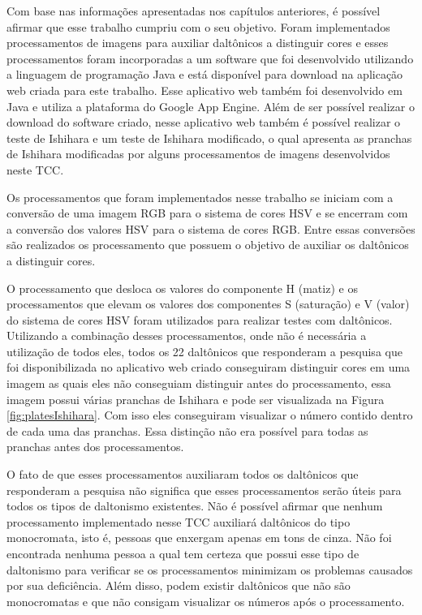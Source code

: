 \documentclass[	12pt, Times, openright, twoside, a4paper, english, brazil]{abntex2}
\begin{document}
Com base nas informações apresentadas nos capítulos anteriores, é possível afirmar que esse trabalho cumpriu com o seu objetivo. Foram implementados processamentos de imagens para auxiliar daltônicos a distinguir cores e esses processamentos foram incorporadas a um software que foi desenvolvido utilizando a linguagem de programação Java e está disponível para download na aplicação web criada para este trabalho. Esse aplicativo web também foi desenvolvido em Java e utiliza a plataforma do Google App Engine. Além de ser possível realizar o download do software criado, nesse aplicativo web também é possível realizar o teste de Ishihara e um teste de Ishihara modificado, o qual apresenta as pranchas de Ishihara modificadas por alguns processamentos de imagens desenvolvidos neste TCC.

Os processamentos que foram implementados nesse trabalho se iniciam com a conversão de uma imagem RGB para o sistema de cores HSV e se encerram com a conversão dos valores HSV para o sistema de cores RGB. Entre essas conversões são realizados os processamento que possuem o objetivo de auxiliar os daltônicos a distinguir cores.

O processamento que desloca os valores do componente H (matiz) e os processamentos que elevam os valores dos componentes S (saturação) e V (valor) do sistema de cores HSV foram utilizados para realizar testes com daltônicos. Utilizando a combinação desses processamentos, onde não é necessária a utilização de todos eles, todos os 22 daltônicos que responderam a pesquisa que foi disponibilizada no aplicativo web criado conseguiram distinguir cores em uma imagem as quais eles não conseguiam distinguir antes do processamento, essa imagem possui várias pranchas de Ishihara e pode ser visualizada na Figura \ref{fig:platesIshihara}. Com isso eles conseguiram visualizar o número contido dentro de cada uma das pranchas. Essa distinção não era possível para todas as pranchas antes dos processamentos. 

O fato de que esses processamentos auxiliaram todos os daltônicos que responderam a pesquisa não significa que esses processamentos serão úteis para todos os tipos de daltonismo existentes. Não é possível afirmar que nenhum processamento implementado nesse TCC auxiliará daltônicos do tipo monocromata, isto é, pessoas que enxergam apenas em tons de cinza. Não foi encontrada nenhuma pessoa a qual tem certeza que possui esse tipo de daltonismo para verificar se os processamentos minimizam os problemas causados por sua deficiência. Além disso, podem existir daltônicos que não são monocromatas e que não consigam visualizar os números após o processamento.
\end{document}
